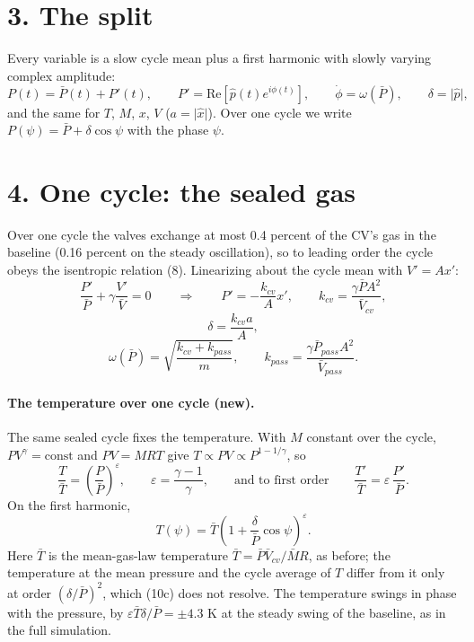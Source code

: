\documentclass[11pt]{article}
\begin{document}
\section*{3. The split}

Every variable is a slow cycle mean plus a first harmonic with slowly varying complex amplitude:
\begin{equation}
P(t) = \bar P(t) + P'(t), \qquad P' = \mathrm{Re}\left[\hat p(t)e^{i\phi(t)}\right], \qquad \dot\phi = \omega(\bar P), \qquad \delta = \lvert\hat p\rvert , \tag{9}
\end{equation}
and the same for $T$, $M$, $x$, $V$ ($a = \lvert\hat x\rvert$). Over one cycle we write $P(\psi) = \bar P + \delta\cos\psi$ with the phase $\psi$.

\section*{4. One cycle: the sealed gas}

Over one cycle the valves exchange at most 0.4 percent of the CV's gas in the baseline (0.16 percent on the steady oscillation), so to leading order the cycle obeys the isentropic relation (8). Linearizing about the cycle mean with $V' = Ax'$:
\begin{equation}
\frac{P'}{\bar P} + \gamma\frac{V'}{\bar V} = 0 \qquad\Longrightarrow\qquad P' = -\frac{k_{cv}}{A}x', \qquad k_{cv} = \frac{\gamma\bar PA^2}{\bar V_{cv}} , \tag{10}
\end{equation}
\begin{equation}
\delta = \frac{k_{cv}a}{A} , \tag{11}
\end{equation}
\begin{equation}
\omega(\bar P) = \sqrt{\frac{k_{cv} + k_{pass}}{m}}, \qquad k_{pass} = \frac{\gamma\bar P_{pass}A^2}{\bar V_{pass}} . \tag{12}
\end{equation}

\paragraph{The temperature over one cycle (new).} The same sealed cycle fixes the temperature. With $M$ constant over the cycle, $PV^{\gamma} = \text{const}$ and $PV = MRT$ give $T \propto PV \propto P^{1-1/\gamma}$, so
\begin{equation}
\frac{T}{\bar T} = \left(\frac{P}{\bar P}\right)^{\varepsilon}, \qquad \varepsilon = \frac{\gamma-1}{\gamma}, \qquad\text{and to first order}\qquad \frac{T'}{\bar T} = \varepsilon\,\frac{P'}{\bar P} . \tag{10b}
\end{equation}
On the first harmonic,
\begin{equation}
T(\psi) = \bar T\left(1 + \frac{\delta}{\bar P}\cos\psi\right)^{\varepsilon} . \tag{10c}
\end{equation}
Here $\bar T$ is the mean-gas-law temperature $\bar T = \bar P\bar V_{cv}/\bar MR$, as before; the temperature at the mean pressure and the cycle average of $T$ differ from it only at order $(\delta/\bar P)^2$, which (10c) does not resolve. The temperature swings in phase with the pressure, by $\varepsilon\bar T\delta/\bar P = \pm 4.3$ K at the steady swing of the baseline, as in the full simulation.
\end{document}
